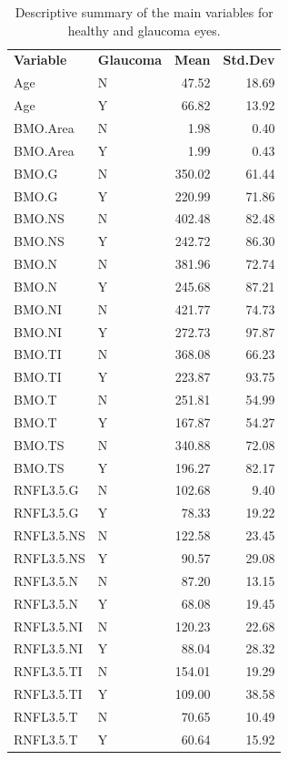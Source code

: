 \documentclass[jcm,article,submit,moreauthors,pdftex]{Definitions/mdpi}
\begin{document}
\begin{table}[ht]
\caption{Descriptive summary of the main variables for healthy and glaucoma eyes.}
\label{tab:descriptive-summary}
\centering
\begin{tabular}{llrr}
  \toprule
\bf Variable & \bf Glaucoma & \bf Mean & \bf Std.Dev \\ 
Age & N & 47.52 & 18.69 \\ 
  Age & Y & 66.82 & 13.92 \\ 
  BMO.Area & N & 1.98 & 0.40 \\ 
  BMO.Area & Y & 1.99 & 0.43 \\ 
  BMO.G & N & 350.02 & 61.44 \\ 
  BMO.G & Y & 220.99 & 71.86 \\ 
  BMO.NS & N & 402.48 & 82.48 \\ 
  BMO.NS & Y & 242.72 & 86.30 \\ 
  BMO.N & N & 381.96 & 72.74 \\ 
  BMO.N & Y & 245.68 & 87.21 \\ 
  BMO.NI & N & 421.77 & 74.73 \\ 
  BMO.NI & Y & 272.73 & 97.87 \\ 
  BMO.TI & N & 368.08 & 66.23 \\ 
  BMO.TI & Y & 223.87 & 93.75 \\ 
  BMO.T & N & 251.81 & 54.99 \\ 
  BMO.T & Y & 167.87 & 54.27 \\ 
  BMO.TS & N & 340.88 & 72.08 \\ 
  BMO.TS & Y & 196.27 & 82.17 \\ 
  RNFL3.5.G & N & 102.68 & 9.40 \\ 
  RNFL3.5.G & Y & 78.33 & 19.22 \\ 
  RNFL3.5.NS & N & 122.58 & 23.45 \\ 
  RNFL3.5.NS & Y & 90.57 & 29.08 \\ 
  RNFL3.5.N & N & 87.20 & 13.15 \\ 
  RNFL3.5.N & Y & 68.08 & 19.45 \\ 
  RNFL3.5.NI & N & 120.23 & 22.68 \\ 
  RNFL3.5.NI & Y & 88.04 & 28.32 \\ 
  RNFL3.5.TI & N & 154.01 & 19.29 \\ 
  RNFL3.5.TI & Y & 109.00 & 38.58 \\ 
  RNFL3.5.T & N & 70.65 & 10.49 \\ 
  RNFL3.5.T & Y & 60.64 & 15.92 \\ 
   \bottomrule

\end{tabular}
\end{table}
\end{document}
